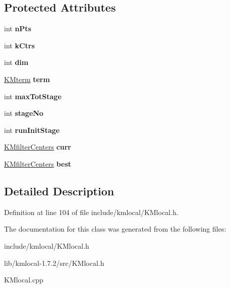 \subsection*{Protected Attributes}
\begin{DoxyCompactItemize}
\item 
\hypertarget{class_k_mlocal_ae31be2bbefee8a01d50e8d2497b6a81f}{
int {\bfseries nPts}}
\label{class_k_mlocal_ae31be2bbefee8a01d50e8d2497b6a81f}

\item 
\hypertarget{class_k_mlocal_a569f85232860bfb2916e1a3fc977a8d6}{
int {\bfseries kCtrs}}
\label{class_k_mlocal_a569f85232860bfb2916e1a3fc977a8d6}

\item 
\hypertarget{class_k_mlocal_a344c3c719f6ea92f809a1b11707aa69a}{
int {\bfseries dim}}
\label{class_k_mlocal_a344c3c719f6ea92f809a1b11707aa69a}

\item 
\hypertarget{class_k_mlocal_a61c16a10a3a41afb66f5d7506ebcb930}{
\hyperlink{class_k_mterm}{KMterm} {\bfseries term}}
\label{class_k_mlocal_a61c16a10a3a41afb66f5d7506ebcb930}

\item 
\hypertarget{class_k_mlocal_aafd0601c11566c1e52c370b5a51bde48}{
int {\bfseries maxTotStage}}
\label{class_k_mlocal_aafd0601c11566c1e52c370b5a51bde48}

\item 
\hypertarget{class_k_mlocal_acf1d5d4ae5cf9e2bd2dcf8ad11af75ee}{
int {\bfseries stageNo}}
\label{class_k_mlocal_acf1d5d4ae5cf9e2bd2dcf8ad11af75ee}

\item 
\hypertarget{class_k_mlocal_a8518fcdccb9909e20edd8db365ff4ae1}{
int {\bfseries runInitStage}}
\label{class_k_mlocal_a8518fcdccb9909e20edd8db365ff4ae1}

\item 
\hypertarget{class_k_mlocal_a54ed1b21f07cb3d69506b31e3b216431}{
\hyperlink{class_k_mfilter_centers}{KMfilterCenters} {\bfseries curr}}
\label{class_k_mlocal_a54ed1b21f07cb3d69506b31e3b216431}

\item 
\hypertarget{class_k_mlocal_a57b20a46efa1fb4e5edbe74eb4d87e8e}{
\hyperlink{class_k_mfilter_centers}{KMfilterCenters} {\bfseries best}}
\label{class_k_mlocal_a57b20a46efa1fb4e5edbe74eb4d87e8e}

\end{DoxyCompactItemize}


\subsection{Detailed Description}


Definition at line 104 of file include/kmlocal/KMlocal.h.



The documentation for this class was generated from the following files:\begin{DoxyCompactItemize}
\item 
include/kmlocal/KMlocal.h\item 
lib/kmlocal-\/1.7.2/src/KMlocal.h\item 
KMlocal.cpp\end{DoxyCompactItemize}
